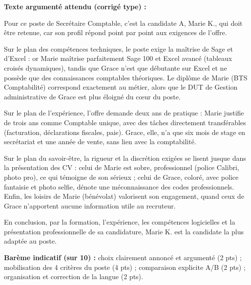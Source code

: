 \documentclass[11pt]{article}
\begin{document}
\begin{corrige}
\textbf{Texte argumenté attendu (corrigé type) :}

Pour ce poste de Secrétaire Comptable, c'est la candidate A, Marie K., qui doit être retenue, car son profil répond point par point aux exigences de l'offre.

Sur le plan des compétences techniques, le poste exige la maîtrise de Sage et d'Excel : or Marie maîtrise parfaitement Sage 100 et Excel avancé (tableaux croisés dynamiques), tandis que Grace n'est que débutante sur Excel et ne possède que des connaissances comptables théoriques. Le diplôme de Marie (BTS Comptabilité) correspond exactement au métier, alors que le DUT de Gestion administrative de Grace est plus éloigné du cœur du poste.

Sur le plan de l'expérience, l'offre demande deux ans de pratique : Marie justifie de trois ans comme Comptable unique, avec des tâches directement transférables (facturation, déclarations fiscales, paie). Grace, elle, n'a que six mois de stage en secrétariat et une année de vente, sans lien avec la comptabilité.

Sur le plan du savoir-être, la rigueur et la discrétion exigées se lisent jusque dans la présentation des CV : celui de Marie est sobre, professionnel (police Calibri, photo pro), ce qui témoigne de son sérieux ; celui de Grace, coloré, avec police fantaisie et photo selfie, dénote une méconnaissance des codes professionnels. Enfin, les loisirs de Marie (bénévolat) valorisent son engagement, quand ceux de Grace n'apportent aucune information utile au recruteur.

En conclusion, par la formation, l'expérience, les compétences logicielles et la présentation professionnelle de sa candidature, Marie K. est la candidate la plus adaptée au poste.

\textbf{Barème indicatif (sur 10) :} choix clairement annoncé et argumenté (2 pts) ; mobilisation des 4 critères du poste (4 pts) ; comparaison explicite A/B (2 pts) ; organisation et correction de la langue (2 pts).
\end{corrige}
\end{document}
